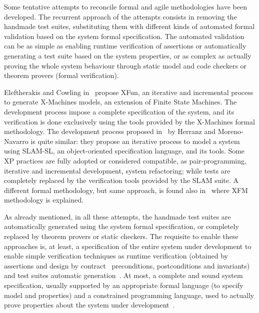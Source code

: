 \documentclass[english]{lni}
\begin{document}
Some tentative attempts to reconcile formal and agile methodologies have been developed.
The recurrent approach of the attempts consists in removing the handmade test suites, substituting them with different kinds of automated formal validation based on the system formal specification. 
The automated validation can be as simple as enabling runtime verification of assertions or automatically generating a test suite based on the system properties, or as complex as actually proving the whole system behaviour through static model and code checkers or theorem provers (formal verification).

Eleftherakis and Cowling in~\cite{Eleftherakis2003} propose XFun, an iterative and incremental process to generate X-Machines models, an extension of Finite State Machines. 
The development process impose a complete specification of the system, and its verification is done exclusively using the tools provided by the X-Machines formal methodology. 
The development process proposed in~\cite{Herranz2003b} by Herranz and Moreno-Navarro is quite similar: they propose an iterative process to model a system using SLAM-SL, an object-oriented specification language, and its tools. 
Some XP practices are fully adopted or considered compatible, as pair-programming, iterative and incremental development, system refactoring; while tests are completely replaced by the verification tools provided by the SLAM suite.
A different formal methodology, but same approach, is found also in~\cite{Suhaib2005} where XFM methodology is explained.

As already mentioned, in all these attempts, the handmade test suites are automatically generated using the system formal specification, or completely replaced by theorem provers or static checkers. 
The requisite to enable these approaches is, at least, a specification of the entire system under development to enable simple verification techniques as runtime verification (obtained by assertions and design by contract~\cite{Meyer1997} preconditions, postconditions and invariants) and test suites automatic generation~\cite{Cheon2002,Cheon2004,Cheon2005}.
At most, a complete and sound system specification, usually supported by an appropriate formal language (to specify model and properties) and a constrained programming language, used to actually prove properties about the system under development~\cite{CatanoHuisman02,DetlefsNelsonSaxe2005,KiniryCok04}.
\end{document}
